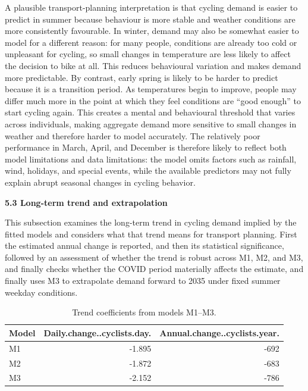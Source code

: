 \documentclass[
]{article}
\begin{document}
A plausible transport-planning interpretation is that cycling demand is easier to predict in summer because behaviour is more stable and weather conditions are more consistently favourable. In winter, demand may also be somewhat easier to model for a different reason: for many people, conditions are already too cold or unpleasant for cycling, so small changes in temperature are less likely to affect the decision to bike at all. This reduces behavioural variation and makes demand more predictable. By contrast, early spring is likely to be harder to predict because it is a transition period. As temperatures begin to improve, people may differ much more in the point at which they feel conditions are ``good enough'' to start cycling again. This creates a mental and behavioural threshold that varies across individuals, making aggregate demand more sensitive to small changes in weather and therefore harder to model accurately. The relatively poor performance in March, April, and December is therefore likely to reflect both model limitations and data limitations: the model omits factors such as rainfall, wind, holidays, and special events, while the available predictors may not fully explain abrupt seasonal changes in cycling behavior.

\textbf{5.3 Long-term trend and extrapolation}

This subsection examines the long-term trend in cycling demand implied by the fitted models and considers what that trend means for transport planning. First the estimated annual change is reported, and then its statistical significance, followed by an assessment of whether the trend is robust across M1, M2, and M3, and finally checks whether the COVID period materially affects the estimate, and finally uses M3 to extrapolate demand forward to 2035 under fixed summer weekday conditions.

\begin{table}[!h]
\centering
\caption{\label{tab:tab-trendcoefs}Trend coefficients from models M1--M3.}
\centering
\begin{tabular}[t]{lrr}
\toprule
Model & Daily.change..cyclists.day. & Annual.change..cyclists.year.\\
\midrule
M1 & -1.895 & -692\\
M2 & -1.872 & -683\\
M3 & -2.152 & -786\\
\bottomrule
\end{tabular}
\end{table}
\end{document}
